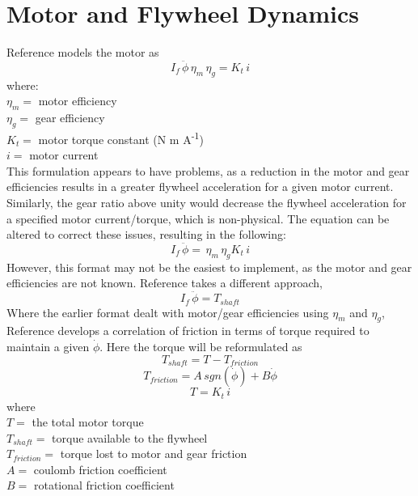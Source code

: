 \documentclass[12pt,letterpaper]{article}
\begin{document}
\section{Motor and Flywheel Dynamics}

Reference \cite{reactionWheel} models the motor as 
%
\begin{equation}
    I_{f} \, \ddot{\phi} \, \eta_{m} \, \eta_{g}  = K_{t} \, i
\end{equation}
%
where: \\
$\eta_{m} =$ motor efficiency \\
$\eta_{g} =$ gear efficiency \\
$K_{t} =$ motor torque constant (N m A\textsuperscript{-1}) \\
$i =$ motor current \\

This formulation appears to have problems, as a reduction in the motor and gear efficiencies results in a 
greater flywheel acceleration for a given motor current.  Similarly, the gear ratio above unity would 
decrease the flywheel acceleration for a specified motor current/torque, which is non-physical.  The equation can be altered
to correct these issues, resulting in the following:
%
\begin{equation}
	I_{f} \, \ddot{\phi} = \, \eta_{m} \, \eta_{g} K_{t} \, i
\end{equation}
%
However, this format may not be the easiest to implement, as the motor and gear efficiencies are not known.  Reference \cite{monograph}
takes a different approach,
%
\begin{equation}
    I_{f} \, \ddot{\phi} = T_{shaft}
\end{equation}
%
Where the earlier format dealt with motor/gear efficiencies using $\eta_{m}$ and $\eta_{g}$, Reference \cite{monograph} develops a correlation of friction in terms of torque required to maintain a given $\dot{\phi}$.  Here the torque will be
reformulated as 
%
\begin{equation}
    T_{shaft} = T - T_{friction}
\end{equation}
%
\begin{equation}
    T_{friction} = A \, sgn(\dot{\phi} ) + B \dot{\phi} 
\end{equation}
%
\begin{equation}
    T = K_{t} \, i
\end{equation}
%
where \\
$T =$ the total motor torque \\
$T_{shaft} =$ torque available to the flywheel \\
$T_{friction} =$ torque lost to motor and gear friction \\
$A =$ coulomb friction coefficient \\
$B =$ rotational friction coefficient \\
\end{document}
